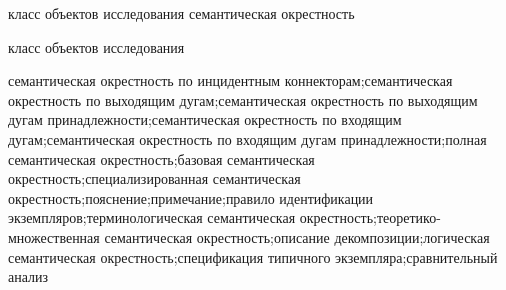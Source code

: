 \begin{SCn}
\scnsectionheader{\currentname}
\begin{scnsubstruct}
\begin{scnhaselementrole}{класс объектов исследования}
семантическая окрестность
\end{scnhaselementrole}
\begin{scnhaselementrolelist}{класс объектов исследования}

семантическая окрестность по инцидентным коннекторам;семантическая окрестность по выходящим дугам;семантическая окрестность по выходящим дугам принадлежности;семантическая окрестность по входящим дугам;семантическая окрестность по входящим дугам принадлежности;полная семантическая окрестность;базовая семантическая окрестность;специализированная семантическая окрестность;пояснение;примечание;правило идентификации экземпляров;терминологическая семантическая окрестность;теоретико-множественная семантическая окрестность;описание декомпозиции;логическая семантическая окрестность;спецификация типичного экземпляра;сравнительный анализ


\end{scnhaselementrolelist}
\end{scnsubstruct}
\end{SCn}
